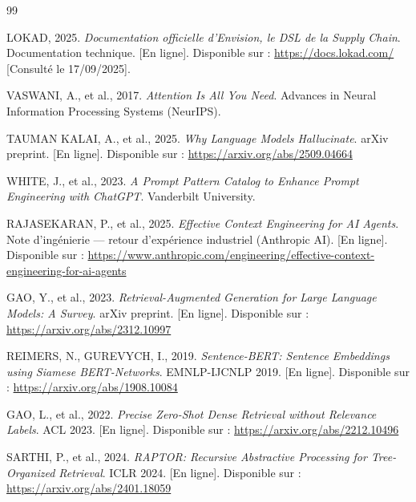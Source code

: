 
\begin{thebibliography}{99}


LOKAD, 2025. 
\textit{Documentation officielle d’Envision, le DSL de la Supply Chain}. 
Documentation technique. 
[En ligne]. Disponible sur : \url{https://docs.lokad.com/} 
[Consulté le 17/09/2025].


VASWANI, A., et al., 2017. 
\textit{Attention Is All You Need}. 
Advances in Neural Information Processing Systems (NeurIPS).

TAUMAN KALAI, A., et al., 2025. 
\textit{Why Language Models Hallucinate}. 
arXiv preprint. 
[En ligne]. Disponible sur : \url{https://arxiv.org/abs/2509.04664}

WHITE, J., et al., 2023. 
\textit{A Prompt Pattern Catalog to Enhance Prompt Engineering with ChatGPT}. 
Vanderbilt University.

RAJASEKARAN, P., et al., 2025. 
\textit{Effective Context Engineering for AI Agents}. 
Note d’ingénierie — retour d’expérience industriel (Anthropic AI). [En ligne]. Disponible sur :
\url{https://www.anthropic.com/engineering/effective-context-engineering-for-ai-agents}

GAO, Y., et al., 2023. 
\textit{Retrieval-Augmented Generation for Large Language Models: A Survey}. 
arXiv preprint. 
[En ligne]. Disponible sur : \url{https://arxiv.org/abs/2312.10997}

REIMERS, N., GUREVYCH, I., 2019. 
\textit{Sentence-BERT: Sentence Embeddings using Siamese BERT-Networks}. 
EMNLP-IJCNLP 2019. 
[En ligne]. Disponible sur : \url{https://arxiv.org/abs/1908.10084}

GAO, L., et al., 2022. 
\textit{Precise Zero-Shot Dense Retrieval without Relevance Labels}. 
ACL 2023. 
[En ligne]. Disponible sur : \url{https://arxiv.org/abs/2212.10496}

SARTHI, P., et al., 2024. 
\textit{RAPTOR: Recursive Abstractive Processing for Tree-Organized Retrieval}. 
ICLR 2024. 
[En ligne]. Disponible sur : \url{https://arxiv.org/abs/2401.18059}


\end{thebibliography}
